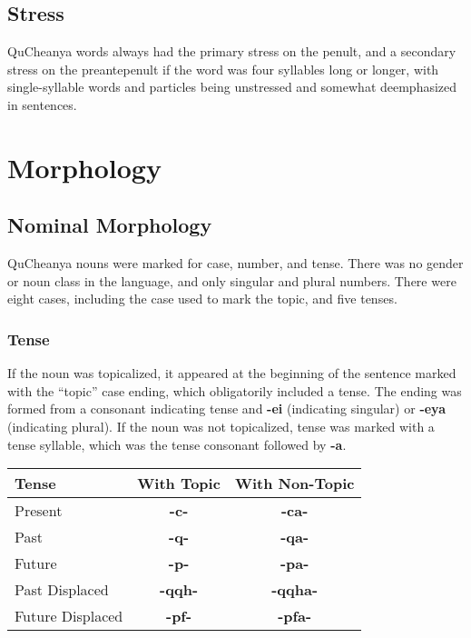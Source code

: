 \documentclass{article}
\begin{document}
\subsection{Stress}
QuCheanya words always had the primary stress on the penult, and a secondary stress on the preantepenult if the word was four syllables long or longer, with single-syllable words and particles being unstressed and somewhat deemphasized in sentences.

\section{Morphology}
\subsection{Nominal Morphology}
QuCheanya nouns were marked for case, number, and tense.  There was no gender or noun class in the language, and only singular and plural numbers.  There were eight cases, including the case used to mark the topic, and five tenses.

\subsubsection{Tense}

If the noun was topicalized, it appeared at the beginning of the sentence marked with the ``topic'' case ending, which obligatorily included a tense.  The ending was formed from a consonant indicating tense and \textbf{-ei} (indicating singular) or \textbf{-eya} (indicating plural).  If the noun was not topicalized, tense was marked with a tense syllable, which was the tense consonant followed by \textbf{-a}.

\begin{table}[h]
\begin{tabular}{l|c c}
Tense & With Topic & With Non-Topic \\
\hline
Present & \textbf{-c-} & \textbf{-ca-} \\
Past & \textbf{-q-} & \textbf{-qa-} \\
Future & \textbf{-p-} & \textbf{-pa-} \\
Past Displaced & \textbf{-qqh-} & \textbf{-qqha-} \\
Future Displaced & \textbf{-pf-} & \textbf{-pfa-} \\
\end{tabular}
\end{table}
\end{document}
